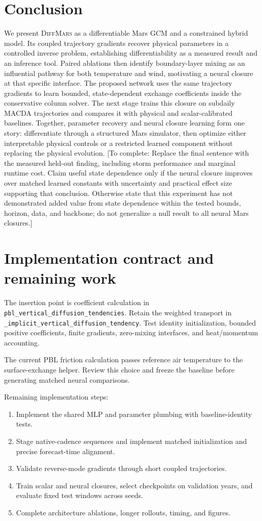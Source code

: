 \documentclass{article}
\newcommand{\model}{\textsc{DiffMars}}
\newcommand{\pending}[1]{\textcolor{blue!65!black}{[To complete: #1]}}
\begin{document}
\section{Conclusion}
We present \model{} as a differentiable Mars GCM and a constrained hybrid
model. Its coupled trajectory gradients recover physical parameters in a
controlled inverse problem, establishing differentiability as a measured result
and an inference tool. Paired ablations then identify boundary-layer mixing as
an influential pathway for both temperature and wind, motivating a neural
closure at that specific interface. The proposed network uses the same
trajectory gradients to learn bounded, state-dependent exchange coefficients
inside the conservative column solver. The next stage trains this closure on
subdaily MACDA trajectories and compares it with physical and
scalar-calibrated baselines. Together, parameter recovery and neural closure
learning form one story: differentiate through a structured Mars simulator,
then optimize either interpretable physical controls or a restricted learned
component without replacing the physical evolution.
\pending{Replace the final sentence with the measured held-out finding,
including storm performance and marginal runtime cost. Claim useful state
dependence only if the neural closure improves over matched learned constants
with uncertainty and practical effect size supporting that conclusion.
Otherwise state that this experiment has not demonstrated added value from
state dependence within the tested bounds, horizon, data, and backbone;
do not generalize a null result to all neural Mars closures.}



\appendix
\section{Implementation contract and remaining work}
The insertion point is coefficient calculation in
\texttt{pbl\_vertical\_diffusion\_tendencies}. Retain the weighted transport in
\texttt{\_implicit\_vertical\_diffusion\_tendency}.
Test identity initialization, bounded positive coefficients, finite gradients,
zero-mixing interfaces, and heat/momentum accounting.

The current PBL friction calculation passes reference air temperature to the
surface-exchange helper. Review this choice and freeze the baseline before
generating matched neural comparisons.

Remaining implementation steps:
\begin{enumerate}
\item Implement the shared MLP and parameter plumbing with baseline-identity tests.
\item Stage native-cadence sequences and implement matched initialization and
precise forecast-time alignment.
\item Validate reverse-mode gradients through short coupled trajectories.
\item Train scalar and neural closures, select checkpoints on validation years,
and evaluate fixed test windows across seeds.
\item Complete architecture ablations, longer rollouts, timing, and figures.
\end{enumerate}
\end{document}
